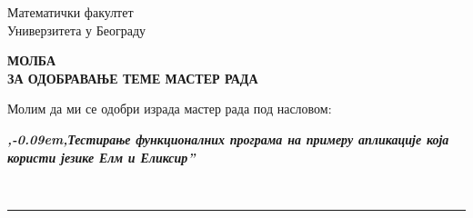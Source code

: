 \documentclass[a4paper]{article}
\def\zn{,\kern-0.09em,}
\begin{document}
\thispagestyle{empty}

\begin{flushleft}
Математички факултет\\
Универзитета у Београду
\end{flushleft}

\bigskip

\begin{center}
\textbf{МОЛБА\\
ЗА ОДОБРАВАЊЕ ТЕМЕ МАСТЕР РАДА
}\end{center}

\bigskip

\begin{flushleft}
Молим да ми се одобри израда мастер рада под насловом:
\end{flushleft}

\begin{minipage}{16.5cm}
\textbf{\textit{\zn Тестирање функционалних програма на примеру апликације која користи језике Елм и Еликсир''}}
\end{minipage}\\
\rule[4mm]{17.5cm}{.05mm}
\end{document}
